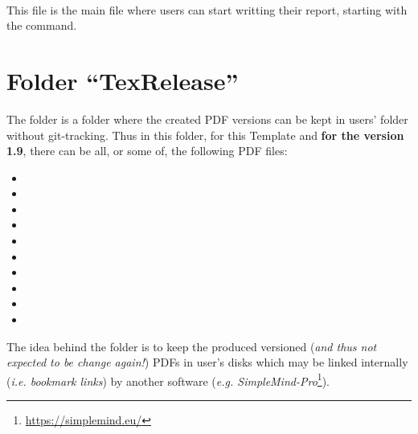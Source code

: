 \begin{description}
\item{\textbf{}} \hfill \\
This file is the main file where users can start writting their report, starting with the \codemr{\\chapter\{\}} command.
\end{description}

\newpage
\section{Folder ``TexRelease''}
The folder  is a folder where the created PDF versions can be kept in users' folder without git-tracking. Thus in this folder, for this Template and \textbf{for the version 1.9}, there can be all, or some of, the following PDF files:
\begin{itemize}
\setlength\itemsep{0em}
\item{}
\item{}
\item{}
\item{}
\item{}
\item{}
\item{}
\item{}
\item{}
\item{}
\end{itemize}

The idea behind the folder  is to keep the produced versioned  (\textit{and thus not expected to be change again!}) PDFs in user's disks which may be linked internally (\textit{i.e. bookmark links}) by another software (\textit{e.g. SimpleMind-Pro}\footnote{\href{https://simplemind.eu/}{https://simplemind.eu/}}).